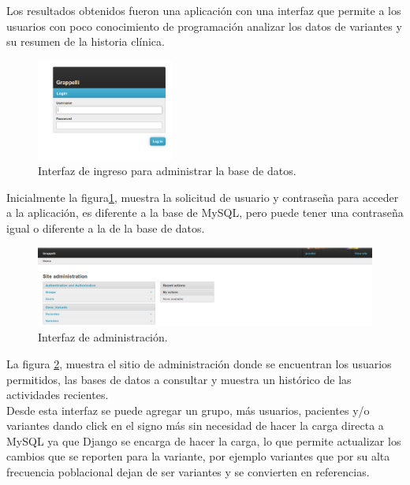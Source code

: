 Los resultados obtenidos fueron una aplicación con una interfaz que permite a los usuarios con poco conocimiento de  programación  analizar los datos de variantes y su resumen de la historia clínica. \\

\begin{figure}[H] 
	\centering
	\includegraphics[width=0.4\textwidth]{Kap3/admin_django}
	\caption{Interfaz de ingreso para  administrar la base de datos.} \label{fig:admin}
\end{figure}

Inicialmente la figura\ref{fig:admin}, muestra la solicitud de usuario y contraseña para acceder a la aplicación, es diferente a la base de MySQL, pero  puede tener  una contraseña igual o diferente a la de la base de datos.\\

\begin{figure}[H] 
	\centering
	\includegraphics[width=1\textwidth]{Kap3/django_admin}
	\caption{Interfaz de administración.} \label{fig:admin2}
\end{figure}

La figura \ref{fig:admin2}, muestra el sitio de administración donde se encuentran los usuarios permitidos, las bases de datos a consultar y muestra un histórico de las actividades recientes. \\

Desde esta interfaz se puede agregar un grupo, más usuarios, pacientes y/o variantes dando click en el signo más sin necesidad de hacer la carga directa a MySQL ya que Django se encarga de hacer la carga, lo que permite actualizar los cambios que se reporten para la variante, por ejemplo variantes que por su alta frecuencia poblacional dejan de ser variantes y se convierten en referencias. \\

